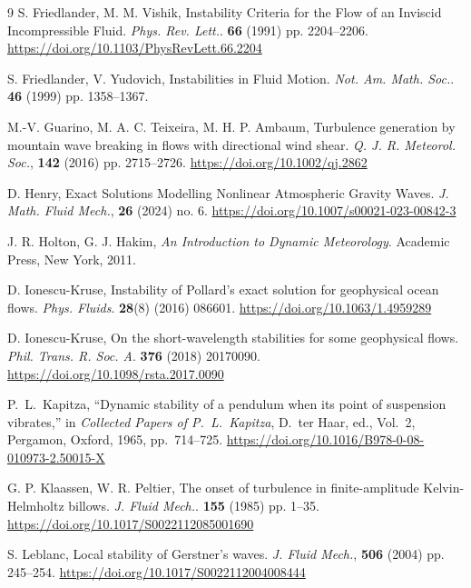 \documentclass[reqno]{amsart}
\begin{document}
\begin{thebibliography}{9}
S. Friedlander, M. M. Vishik, Instability {C}riteria for the {F}low of an {I}nviscid {I}ncompressible {F}luid. \textit{Phys. Rev. Lett.}. {\bf 66} (1991) pp. 2204--2206.
 \url{https://doi.org/10.1103/PhysRevLett.66.2204}



S. Friedlander, V. Yudovich, Instabilities in Fluid Motion. \textit{Not. Am. Math. Soc.}. {\bf 46} (1999) pp. 1358--1367.



M.-V. Guarino, M. A. C. Teixeira, M. H. P. Ambaum, Turbulence generation by mountain wave breaking in flows with directional wind shear. \textit{Q. J. R. Meteorol. Soc.}, {\bf  142} (2016) pp. 2715--2726.
 \url{https://doi.org/10.1002/qj.2862}



D. Henry, Exact Solutions Modelling Nonlinear Atmospheric Gravity Waves. \textit{J. Math. Fluid Mech.}, {\bf 26} (2024) no. 6.
 \url{https://doi.org/10.1007/s00021-023-00842-3}



J. R.  Holton, G. J. Hakim, {\em An Introduction to Dynamic Meteorology}. Academic Press, New York, 2011.




D. Ionescu-Kruse,  Instability of {P}ollard's exact solution for geophysical ocean flows. \textit{Phys. Fluids}. {\bf 28}(8) (2016) 086601.
 \url{https://doi.org/10.1063/1.4959289}

D. Ionescu-Kruse, On the short-wavelength stabilities for some geophysical flows. \textit{Phil. Trans. R. Soc. A}. {\bf 376} (2018) 20170090.
 \url{https://doi.org/10.1098/rsta.2017.0090}

P.~L.~Kapitza,
``Dynamic stability of a pendulum when its point of suspension vibrates,''
in \textit{Collected Papers of P.~L.~Kapitza},
D.~ter Haar, ed.,
Vol.~2, Pergamon, Oxford, 1965, pp.~714--725.
\url{https://doi.org/10.1016/B978-0-08-010973-2.50015-X}

G. P. Klaassen, W. R. Peltier, The onset of turbulence in finite-amplitude {K}elvin-{H}elmholtz billows. \textit{J. Fluid Mech.}. {\bf 155} (1985) pp. 1--35. \url{https://doi.org/10.1017/S0022112085001690}



S. Leblanc, Local stability of {G}erstner's waves. \textit{J. Fluid Mech.}, {\bf 506} (2004) pp. 245--254.
 \url{https://doi.org/10.1017/S0022112004008444}



\end{thebibliography}
\end{document}
